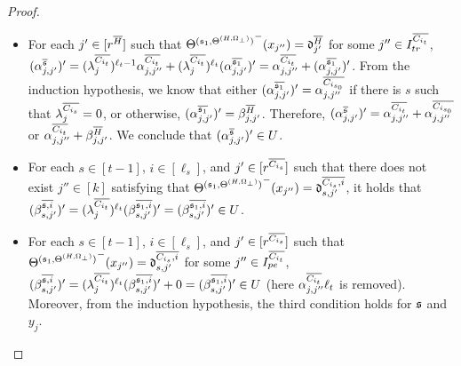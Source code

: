 \begin{appendix}
\begin{proof}
\begin{itemize}
	\item For each $j' \in [r^{\overline{H}}]$ such that ${\Theta^{({\mathfrak{s} }_1,\Theta^{(H,\Omega_\bot)})}}^-(x_{j''})=\mathfrak{d}^{\overline{H}}_{j'}$ for some $j''  \in I^{\overline{C_{i_t}}}_{tr}$, $(\alpha^{\overline{{\mathfrak{s} }}}_{j, j'})' =(\lambda^{\overline{C_{i_t}}}_{j})^{\ell_t-1} \alpha^{\overline{C_{i_t}}}_{j,j''} + (\lambda^{\overline{C_{i_t}}}_{j})^{\ell_t} (\alpha^{\overline{{\mathfrak{s} }_1}}_{j, j'})' = \alpha^{\overline{C_{i_t}}}_{j,j''} + (\alpha^{\overline{{\mathfrak{s} }_1}}_{j, j'})' $. From the induction hypothesis, we know that either $(\alpha^{\overline{{\mathfrak{s} }_1}}_{j, j'})' = \alpha^{\overline{C_{i_{s_0}}}}_{j,j''}$ if there is $s$ such that $\lambda^{\overline{C_{i_s}}}_j =0$,  or otherwise, $(\alpha^{\overline{{\mathfrak{s} }_1}}_{j, j'})'=\beta^{\overline{H}}_{j, j'}$. Therefore, $(\alpha^{\overline{{\mathfrak{s} }}}_{j, j'})' =\alpha^{\overline{C_{i_t}}}_{j,j''} +  \alpha^{\overline{C_{i_{s_0}}}}_{j,j''}$ or $\alpha^{\overline{C_{i_t}}}_{j,j''}+ \beta^{\overline{H}}_{j, j'}$. We conclude that $(\alpha^{\overline{{\mathfrak{s} }}}_{j, j'})' \in U$.
	\item For each $s \in [t-1]$, $i \in [\ell_s]$, and $j' \in [r^{\overline{C_{i_s}}}]$ such that there does not exist $j'' \in [k]$ satisfying that ${\Theta^{({\mathfrak{s} }_1,\Theta^{(H,\Omega_\bot)})}}^-(x_{j''}) = \mathfrak{d}^{\overline{C_{i_s}, i}}_{s, j'}$, it holds that $(\beta^{\overline{{\mathfrak{s} },i}}_{s,j'})' = (\lambda^{\overline{C_{i_t}}}_{j})^{\ell_t}  (\beta^{\overline{{\mathfrak{s} }_1, i}}_{s, j'})'  =  (\beta^{\overline{{\mathfrak{s} }_1, i}}_{s, j'})'  \in U$. 
	\item For each $s \in [t-1]$, $i \in [\ell_s]$, and $j' \in [r^{\overline{C_{i_s}}}]$ such that ${\Theta^{({\mathfrak{s} }_1,\Theta^{(H,\Omega_\bot)})}}^-(x_{j''}) = \mathfrak{d}^{\overline{C_{i_s}, i}}_{s, j'}$ for some $j'' \in I^{\overline{C_{i_t}}}_{pe}$, $(\beta^{\overline{{\mathfrak{s} },i}}_{s,j'})' =(\lambda^{\overline{C_{i_t}}}_{j})^{\ell_t}  (\beta^{\overline{{\mathfrak{s} }_1, i}}_{s, j'})'+ 0  =  (\beta^{\overline{{\mathfrak{s} }_1, i}}_{s, j'})' \in U$ (here $\alpha^{\overline{C_{i_t}}}_{j, j''} \ell_t$ is removed). Moreover, from the induction hypothesis, the third condition holds for ${\mathfrak{s} }$ and $y_j$.

\end{itemize}
\end{proof}
\end{appendix}
